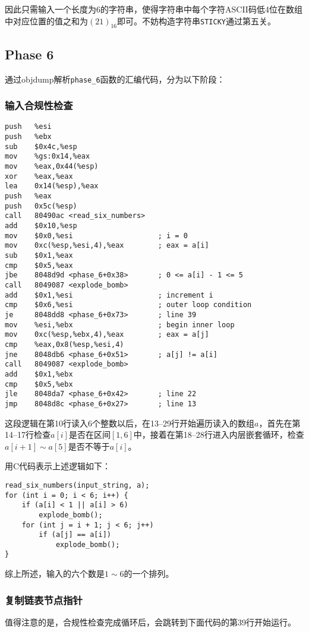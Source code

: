 \documentclass[a4paper, 11pt]{ctexart}
\begin{document}
因此只需输入一个长度为$6$的字符串，使得字符串中每个字符ASCII码低4位在数组中对应位置的值之和为$(21)_{16}$即可。不妨构造字符串\texttt{STICKY}通过第五关。

\subsection{Phase 6}

通过objdump解析\texttt{phase\_6}函数的汇编代码，分为以下阶段：

\subsubsection{输入合规性检查}
\begin{verbatim}
push   %esi
push   %ebx
sub    $0x4c,%esp
mov    %gs:0x14,%eax
mov    %eax,0x44(%esp)
xor    %eax,%eax
lea    0x14(%esp),%eax
push   %eax
push   0x5c(%esp)
call   80490ac <read_six_numbers>
add    $0x10,%esp
mov    $0x0,%esi                    ; i = 0
mov    0xc(%esp,%esi,4),%eax        ; eax = a[i]
sub    $0x1,%eax
cmp    $0x5,%eax
jbe    8048d9d <phase_6+0x38>       ; 0 <= a[i] - 1 <= 5
call   8049087 <explode_bomb>
add    $0x1,%esi                    ; increment i
cmp    $0x6,%esi                    ; outer loop condition
je     8048dd8 <phase_6+0x73>       ; line 39
mov    %esi,%ebx                    ; begin inner loop
mov    0xc(%esp,%ebx,4),%eax        ; eax = a[j]
cmp    %eax,0x8(%esp,%esi,4)
jne    8048db6 <phase_6+0x51>       ; a[j] != a[i]
call   8049087 <explode_bomb>
add    $0x1,%ebx
cmp    $0x5,%ebx
jle    8048da7 <phase_6+0x42>       ; line 22
jmp    8048d8c <phase_6+0x27>       ; line 13
\end{verbatim}

这段逻辑在第10行读入6个整数以后，在13--29行开始遍历读入的数组$a$，首先在第14--17行检查$a[i]$是否在区间$[1, 6]$中，接着在第18--28行进入内层嵌套循环，检查$a[i+1]\sim a[5]$是否不等于$a[i]$。

用C代码表示上述逻辑如下：

\begin{verbatim}
read_six_numbers(input_string, a);
for (int i = 0; i < 6; i++) {
    if (a[i] < 1 || a[i] > 6)
        explode_bomb();
    for (int j = i + 1; j < 6; j++)
        if (a[j] == a[i])
            explode_bomb();
}
\end{verbatim}

综上所述，输入的六个数是$1\sim 6$的一个排列。

\subsubsection{复制链表节点指针}
\label{sssec:cp_list}
值得注意的是，合规性检查完成循环后，会跳转到下面代码的第39行开始运行。
\end{document}
